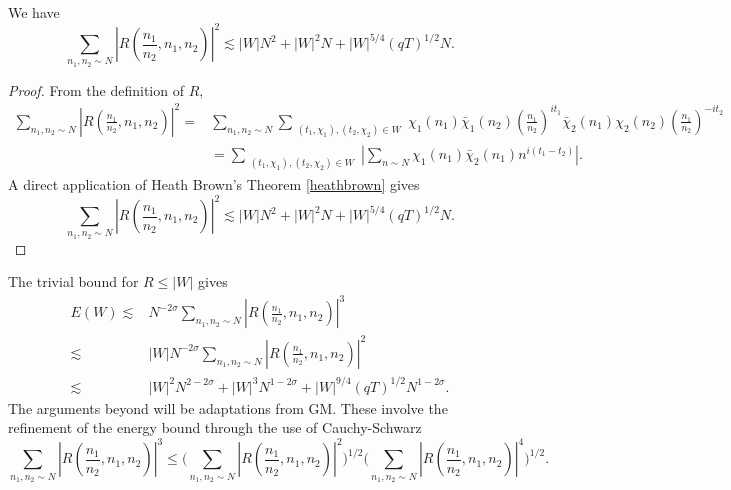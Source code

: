 \begin{lemma}
    We have 
\[
        \sum_{n_1,n_2\sim N}\left|R\left(\frac{n_1}{n_2},n_1,n_2\right) \right|^2\lesssim |W|N^2+ |W|^2N + |W|^{5/4}(qT)^{1/2}N.
    \]
\end{lemma}
\begin{proof}
    From the definition of $R$, \begin{align*}
        \sum_{n_1,n_2\sim N}\left|R\left(\frac{n_1}{n_2},n_1,n_2\right) \right|^2=& \sum_{n_1,n_2\sim N}\sum_{\substack{(t_1,\chi_1),(t_2,\chi_2)\in W}}
        \chi_1(n_1)\bar{\chi}_1(n_2)\left(\frac{n_1}{n_2}\right)^{it_1}\bar{\chi}_2(n_1){\chi}_2(n_2)\left(\frac{n_1}{n_2}\right)^{-it_2}
        \\
        &=\sum_{\substack{(t_1,\chi_1),(t_2,\chi_2)\in W}}\left|\sum_{n\sim N}
        \chi_1(n_1)\bar{\chi}_2(n_1)n^{i(t_1-t_2)}\right|.
    \end{align*}
    A direct application of Heath Brown's Theorem \ref{heathbrown} gives \[
        \sum_{n_1,n_2\sim N}\left|R\left(\frac{n_1}{n_2},n_1,n_2\right) \right|^2\lesssim |W|N^2+ |W|^2N + |W|^{5/4}(qT)^{1/2}N.
    \]
\end{proof}
The trivial bound for $R\leq |W|$ gives \begin{align*}
    E(W)\lesssim& N^{-2\sigma}\sum_{n_1,n_2\sim N}\left|R\left(\frac{n_1}{n_2},n_1,n_2\right) \right|^3\\
    \lesssim &|W|N^{-2\sigma}\sum_{n_1,n_2\sim N}\left|R\left(\frac{n_1}{n_2},n_1,n_2\right) \right|^2\\
    \lesssim& |W|^2N^{2-2\sigma}+ |W|^3N^{1-2\sigma} + |W|^{9/4}(qT)^{1/2}N^{{1-2\sigma}}.
\end{align*}
The arguments beyond will be adaptations from GM. These involve the refinement of the energy bound through the use of Cauchy-Schwarz\[
    \sum_{n_1,n_2\sim N}\left|R\left(\frac{n_1}{n_2},n_1,n_2\right) \right|^3\leq  \Big(\sum_{n_1,n_2\sim N}\left|R\left(\frac{n_1}{n_2},n_1,n_2\right) \right|^2\Big)^{1/2} \Big(\sum_{n_1,n_2\sim N}\left|R\left(\frac{n_1}{n_2},n_1,n_2\right) \right|^4 \Big)^{1/2}.
\]

